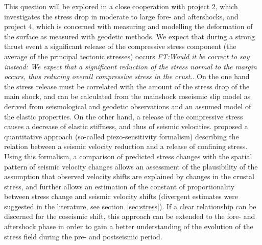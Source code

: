 \documentclass[11pt]{article}
\newcommand{\noteft}[1]{{\it \color{magenta} FT:#1}}
\newcommand{\noteft}[1]{}
\begin{document}
This question will be explored in a close cooperation with project 2, which investigates the stress drop in moderate to large fore- and aftershocks, and project 4, which is concerned with measuring and modelling the deformation of the surface as measured with geodetic methods. We expect that during a strong thrust event a significant release of the compressive stress component (the average of the principal tectonic stresses) occurs\noteft{Would it be correct to say instead: We expect that a significant reduction of the stress normal to the margin occurs, thus reducing overall compressive stress in the crust.}. On the one hand the stress release must be correlated with the amount of the stress drop of the main shock, and can be calculated from the mainshock coseismic slip model as derived from seismological and geodetic observations \citep[e.g.][]{schurr2014} and an assumed model of the elastic properties. 
On the other hand, a release of the compressive stress causes a decrease of elastic stiffness, and thus of seismic velocities. \cite{shapiro:2003a} proposed a quantitative approach (so-called piezo-sensitivity formalism)  describing the relation between a seismic velocity reduction and a release of confining stress.
 Using this formalism, a comparison of predicted stress changes with the spatial pattern of seismic velocity changes allows an assessment of the plausibility of the assumption that observed velocity shifts are explained by changes in the crustal stress, and further allows an estimation of the constant of proportionality between stress change and seismic velocity shifts (divergent estimates were suggested in the literature, see section~\ref{sec:stress}). If a clear relationship can be discerned for the coseismic shift, this approach can be extended to the fore- and aftershock phase in order to gain a better understanding of the evolution of the stress field during the pre- and postseismic period.
\end{document}
